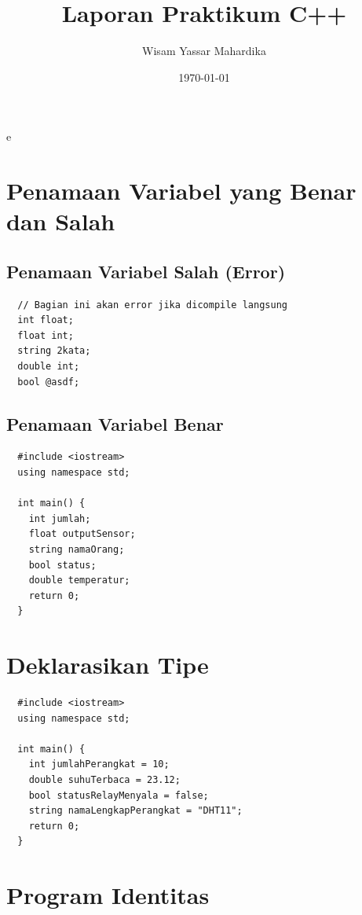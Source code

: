 e\documentclass[12pt,a4paper]{article}
\title{\textbf{Laporan Praktikum C++}}
\author{Wisam Yassar Mahardika}
\date{\today}
\begin{document}
\maketitle

\section{Penamaan Variabel yang Benar dan Salah}

\subsection{Penamaan Variabel Salah (Error)}
\begin{lstlisting}
  // Bagian ini akan error jika dicompile langsung
  int float;
  float int;
  string 2kata;
  double int;
  bool @asdf;
\end{lstlisting}

\subsection{Penamaan Variabel Benar}
\begin{lstlisting}
  #include <iostream>
  using namespace std;

  int main() {
    int jumlah;
    float outputSensor;
    string namaOrang;
    bool status;
    double temperatur;
    return 0;
  }
\end{lstlisting}

\section{Deklarasikan Tipe}
\begin{lstlisting}
  #include <iostream>
  using namespace std;

  int main() {
    int jumlahPerangkat = 10;
    double suhuTerbaca = 23.12;
    bool statusRelayMenyala = false;
    string namaLengkapPerangkat = "DHT11";
    return 0;
  }
\end{lstlisting}

\section{Program Identitas}
\end{document}
